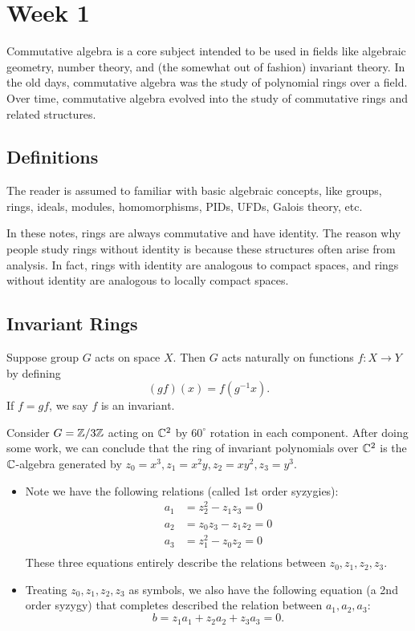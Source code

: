 \section{Week 1}
Commutative algebra is a core subject intended to be used in fields like algebraic geometry, number theory, and (the somewhat out of fashion) invariant theory. In the old days, commutative algebra was the study of polynomial rings over a field. Over time, commutative algebra evolved into the study of commutative rings and related structures.

\subsection{Definitions}
The reader is assumed to familiar with basic algebraic concepts, like groups, rings, ideals, modules, homomorphisms, PIDs, UFDs, Galois theory, etc.

In these notes, rings are always commutative and have identity. The reason why people study rings without identity is because these structures often arise from analysis. In fact, rings with identity are analogous to compact spaces, and rings without identity are analogous to locally compact spaces.

\subsection{Invariant Rings}
Suppose group $G$ acts on space $X$. Then $G$ acts naturally on functions $f: X \to Y$ by defining
\[
    (gf)(x) = f(g^{-1}x).
\]
If $f = gf$, we say $f$ is an invariant.

Consider $G = {\mathbb Z}/3{\mathbb Z}$ acting on ${\mathbb C}^2$ by $60^{\circ}$ rotation in each component. After doing some work, we can conclude that the ring of invariant polynomials over ${\mathbb C}^2$ is the ${\mathbb C}$-algebra generated by $z_0 = x^3, z_1 = x^2y, z_2 = xy^2, z_3 = y^3$.
\begin{itemize}
    \item Note we have the following relations (called 1st order syzygies):
    \[
        \begin{split}
            a_1 &= z_2^2 - z_1z_3 = 0\\
            a_2 &= z_0z_3 - z_1z_2 = 0\\
            a_3 &= z_1^2 - z_0z_2 = 0\\
        \end{split}
    \]
    These three equations entirely describe the relations between $z_0, z_1, z_2, z_3$.
    \item Treating $z_0, z_1, z_2, z_3$ as symbols, we also have the following equation (a 2nd order syzygy) that completes described the relation between $a_1, a_2, a_3$:
    \[
        b = z_1a_1 + z_2a_2 + z_3a_3 = 0.
    \]
\end{itemize}

